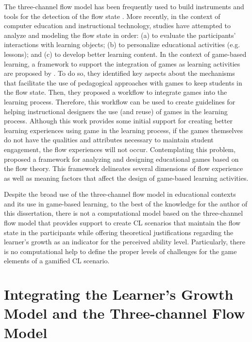 The three-channel flow model has been frequently used to build instruments and tools for the detection of the flow state \cite{KortReillyPicard2001,PearceAinleyHoward2005,Esteban-MillatMartinez-LopezHuertas-GarciaMeseguerRodriguez-Ardura2014,LeeJhengHsiao2014}.
More recently, in the context of computer education and instructional technology, studies have attempted to analyze and modeling the flow state in order: (a) to evaluate the participants’ interactions with learning objects; (b) to personalize educational activities (e.g. lessons); and (c) to develop better learning content.
In the context of game-based learning, a framework to support the integration of games as learning activities are proposed by .
To do so, they identified key aspects about the mechanisms that facilitate the use of pedagogical approaches with games to keep students in the flow state.
Then, they proposed a workflow to integrate games into the learning process.
Therefore, this workflow can be used to create guidelines for helping instructional designers the use (and reuse) of games in the learning process.
Although this work provides some initial support for creating better learning experiences using game in the learning process, if the games themselves do not have the qualities and attributes necessary to maintain student engagement, the flow experiences will not occur.
Contemplating this problem,  proposed a framework for analyzing and designing educational games based on the flow theory.
This framework delineates several dimensions of flow experience as well as meaning factors that affect the design of game-based learning activities.


Despite the broad use of the three-channel flow model in educational contexts and its use in game-based learning, to the best of the knowledge for the author of this dissertation, there is not a computational model based on the three-channel flow model that provides support to create CL scenarios that maintain the flow state in the participants while offering theoretical justifications regarding the learner’s growth as an indicator for the perceived ability level.
Particularly, there is no computational help to define the proper levels of challenges for the game elements of a gamified CL scenario.

\section{Integrating the Learner’s Growth Model and the Three-channel Flow Model}
\label{sec:integrating-learners-growth-model-flow-theory}


